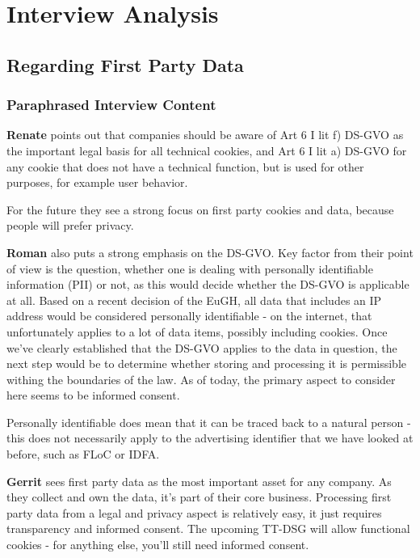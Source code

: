 %
%

\pagebreak
\section{Interview Analysis}

\onehalfspacing

\subsection{Regarding First Party Data}

\subsubsection{Paraphrased Interview Content}

\textbf{Renate} points out that companies should be aware of Art 6 I lit f) DS-GVO as the important legal basis for all technical cookies, and Art 6 I lit a) DS-GVO for any cookie that does not have a technical function, but is used for other purposes, for example user behavior.

For the future they see a strong focus on first party cookies and data, because people will prefer privacy.

\textbf{Roman} also puts a strong emphasis on the DS-GVO. Key factor from their point of view is the question, whether one is dealing with personally identifiable information (PII) or not, as this would decide whether the DS-GVO is applicable at all. Based on a recent decision of the EuGH, all data that includes an IP address would be considered personally identifiable - on the internet, that unfortunately applies to a lot of data items, possibly including cookies. Once we've clearly established that the DS-GVO applies to the data in question, the next step would be to determine whether storing and processing it is permissible withing the boundaries of the law. As of today, the primary aspect to consider here seems to be informed consent.

Personally identifiable does mean that it can be traced back to a natural person - this does not necessarily apply to the advertising identifier that we have looked at before, such as FLoC or IDFA.

\textbf{Gerrit} sees first party data as the most important asset for any company. As they collect and own the data, it's part of their core business. Processing first party data from a legal and privacy aspect is relatively easy, it just requires transparency and informed consent. The upcoming TT-DSG will allow functional cookies - for anything else, you'll still need informed consent. 

